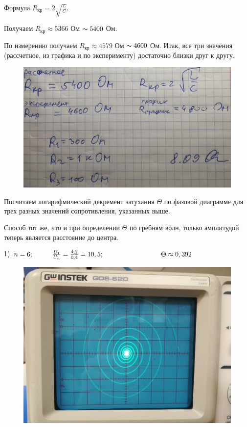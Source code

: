 \documentclass[a4paper,12pt]{article} %
\begin{document}
Формула $R_{\text{кр}} = 2\sqrt{\frac{L}{C}}$.

Получаем $R_{\text{кр}} \approx 5366$ Ом $\thicksim 5400$ Ом.

По измерению получаем $R_{\text{кр}} \approx 4579$ Ом $\thicksim 4600$ Ом. Итак, все три значения (рассчетное, из графика и по эксперименту) достаточно близки друг к другу.

\newpage

\begin{figure}[h!]
	\centering
	\includegraphics[scale=0.3]{R.jpg}
\end{figure}

\vspace{7mm}

Посчитаем логарифмический декремент затухания $\Theta$ по фазовой диаграмме для трех разных значений сопротивления, указанных выше.

Способ тот же, что и при определении $\Theta$ по гребням волн, только амплитудой теперь является расстояние до центра.

1) $n = 6; \hspace{10mm} \frac{U_1}{U_n} = \frac{4,2}{0,4} = 10,5; \hspace{30mm} \Theta \approx 0,392$

\begin{figure}[h!]
	\centering
	\includegraphics[scale=0.22]{1.jpg}
\end{figure}
\end{document}
